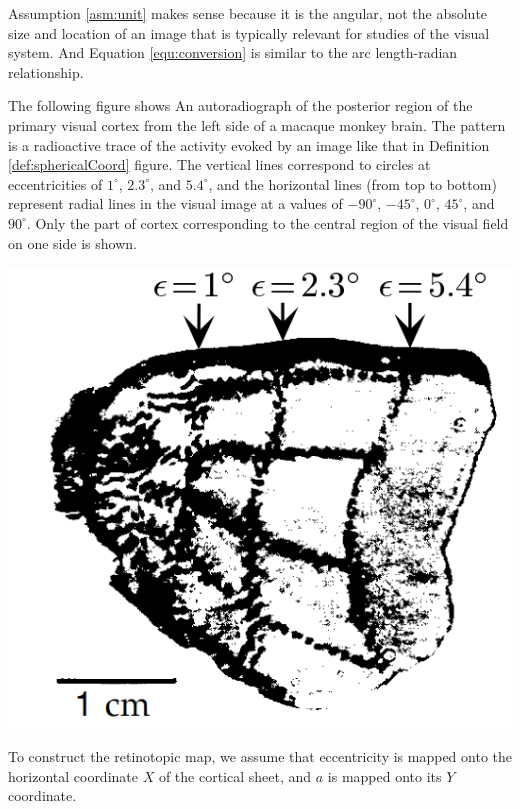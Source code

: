 \begin{rem}
  Assumption \ref{asm:unit} makes sense because it is the angular, not the absolute size and location of an image that is typically relevant for studies of the visual system. And Equation \ref{equ:conversion} is similar to the arc length-radian relationship.
\end{rem}

\begin{exm}
  \label{exm:cortexImage}
  The following figure shows An autoradiograph of the posterior region of the primary visual cortex from the left side of a macaque monkey brain. The pattern is a radioactive trace of the activity evoked by an image like that in Definition \ref{def:sphericalCoord} figure. The vertical lines correspond to circles at eccentricities of $1^{\circ}$, $2.3^{\circ}$, and $5.4^{\circ}$, and the horizontal lines (from top to bottom) represent radial lines in the visual image at a values of $-90^{\circ}$, $-45^{\circ}$, $0^{\circ}$, $45^{\circ}$, and $90^{\circ}$. Only the part of cortex corresponding to the central region of the visual field on one side is shown.
  \begin{center}
    \includegraphics[scale=0.2]{./png/exm_cortexImage}
  \end{center}
\end{exm}

\begin{rem}
  \label{mapOnto}
  To construct the retinotopic map, we assume that eccentricity is mapped onto the horizontal coordinate $X$ of the cortical sheet, and $a$ is mapped onto its $Y$ coordinate.
\end{rem}

